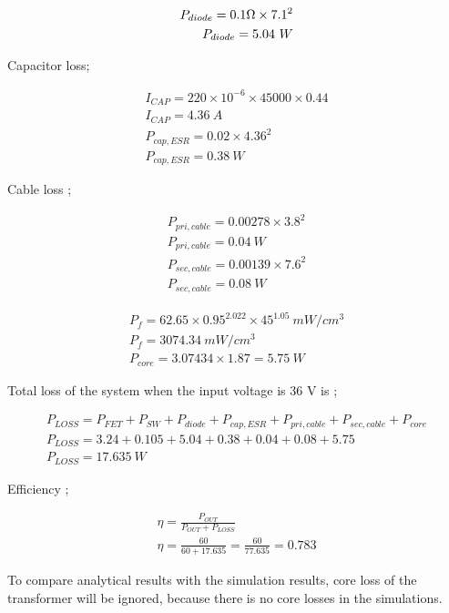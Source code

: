\begin{align}
 P_{diode} = 0.1 \ohm \times 7.1 ^2 \\
 P_{diode} = 5.04\ W
\end{align}

Capacitor loss;

\begin{align}
     I_{CAP} =  220\times 10^{-6} \times 45000 \times 0.44 \\
     I_{CAP} = 4.36\ A\ \\
     P_{cap,ESR} = 0.02 \times 4.36^2 \\
     P_{cap,ESR} = 0.38\ W     
\end{align}

Cable loss ;

 \begin{align}
     P_{pri,cable} = 0.00278 \times 3.8^2 \\
     P_{pri,cable} = 0.04\ W     \\
     P_{sec,cable} = 0.00139 \times 7.6^2 \\
     P_{sec,cable} = 0.08\ W
 \end{align}
 
 \begin{align}
     P_f = 62.65\times 0.95^2.022 \times 45^1.05\ mW/cm^3\\
     P_f = 3074.34\ mW/cm^3 \\
     P_{core} = 3.07434 \times 1.87 = 5.75\ W
 \end{align}
 
 Total loss of the system when the input voltage is 36 V is ;
 
 \begin{align}
    P_{LOSS}= P_{FET} + P_{SW} + P_{diode} + P_{cap,ESR} + P_{pri,cable} + P_{sec,cable} + P_{core} \\
   P_{LOSS} = 3.24 + 0.105 + 5.04 + 0.38 + 0.04 + 0.08 + 5.75 \\
    P_{LOSS} = 17.635\ W 
 \end{align}
 
 Efficiency ;
 
 \begin{align}
     \eta = \frac{P_{OUT}}{P_{OUT}+P_{LOSS}}\\
     \eta = \frac{60}{60+17.635} = \frac{60}{77.635} = 0.783
 \end{align}
 
 To compare analytical results with the simulation results, core loss of the transformer will be ignored, because there is no core losses in the simulations. 
 
